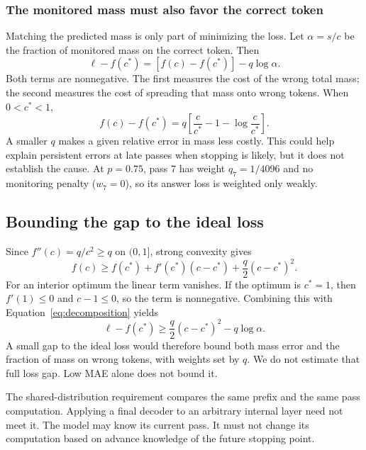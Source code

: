 \subsubsection{The monitored mass must also favor the correct token}
Matching the predicted mass is only part of minimizing the loss. Let $\alpha=s/c$ be the fraction of monitored mass on the correct token. Then
\begin{equation}
 \ell-f(c^*)=\left[f(c)-f(c^*)\right]-q\log\alpha.
 \label{eq:decomposition}
\end{equation}
Both terms are nonnegative. The first measures the cost of the wrong total mass; the second measures the cost of spreading that mass onto wrong tokens. When $0<c^*<1$,
\begin{equation}
 f(c)-f(c^*)=q\left[\frac{c}{c^*}-1-\log\frac{c}{c^*}\right].
\end{equation}
A smaller $q$ makes a given relative error in mass less costly. This could help explain persistent errors at late passes when stopping is likely, but it does not establish the cause. At $p=0.75$, pass 7 has weight $q_7=1/4096$ and no monitoring penalty ($w_7=0$), so its answer loss is weighted only weakly.

\subsection{Bounding the gap to the ideal loss}
Since $f''(c)=q/c^2\ge q$ on $(0,1]$, strong convexity gives
\begin{equation}
 f(c)\ge f(c^*)+f'(c^*)(c-c^*)+\frac q2(c-c^*)^2.
\end{equation}
For an interior optimum the linear term vanishes. If the optimum is $c^*=1$, then $f'(1)\le0$ and $c-1\le0$, so the term is nonnegative. Combining this with Equation~\eqref{eq:decomposition} yields
\begin{equation}
 \ell-f(c^*)\ge\frac q2(c-c^*)^2-q\log\alpha.
\end{equation}
A small gap to the ideal loss would therefore bound both mass error and the fraction of mass on wrong tokens, with weights set by $q$. We do not estimate that full loss gap. Low MAE alone does not bound it.

The shared-distribution requirement compares the same prefix and the same pass computation. Applying a final decoder to an arbitrary internal layer need not meet it. The model may know its current pass. It must not change its computation based on advance knowledge of the future stopping point.


